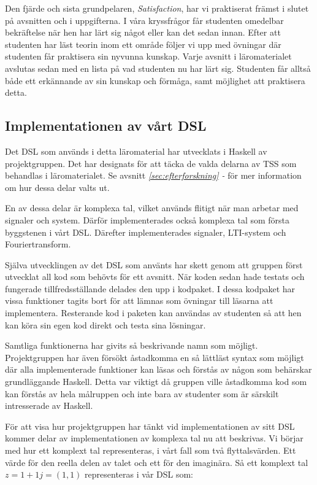 \documentclass[12pt,a4paper,twoside,openright]{article}
\begin{document}
Den fjärde och sista grundpelaren, \textit{Satisfaction}, har vi
praktiserat främst i slutet på avsnitten och i uppgifterna. I våra
kryssfrågor får studenten omedelbar bekräftelse när hen har lärt sig
något eller kan det sedan innan. Efter att studenten har läst teorin
inom ett område följer vi upp med övningar där studenten får
praktisera sin nyvunna kunskap. Varje avsnitt i läromaterialet
avslutas sedan med en lista på vad studenten nu har lärt
sig. Studenten får alltså både ett erkännande av sin kunskap och
förmåga, samt möjlighet att praktisera detta.

\subsection{Implementationen av vårt DSL}
\label{sec:implDSL}
Det DSL som används i detta läromaterial har utvecklats i Haskell av
projektgruppen. Det har designats för att täcka de valda delarna av
TSS som behandlas i läromaterialet. Se avsnitt
\textit{\ref{sec:efterforskning} - } för mer
information om hur dessa delar valts ut.

En av dessa delar är komplexa tal, vilket används flitigt när man
arbetar med signaler och system. Därför implementerades också komplexa
tal som första byggstenen i vårt DSL. Därefter implementerades
signaler, LTI-system och Fouriertransform.

Själva utvecklingen av det DSL som använts har skett genom att gruppen
först utvecklat all kod som behövts för ett avsnitt. När koden sedan
hade testats och fungerade tillfredsställande delades den upp i
kodpaket. I dessa kodpaket har vissa funktioner tagits bort för att
lämnas som övningar till läsarna att implementera. Resterande kod i
paketen kan användas av studenten så att hen kan köra sin egen kod
direkt och testa sina lösningar.

Samtliga funktionerna har givits så beskrivande namn som
möjligt. Projektgruppen har även försökt åstadkomma en så lättläst
syntax som möjligt där alla implementerade funktioner kan läsas och
förstås av någon som behärskar grundläggande Haskell. Detta var
viktigt då gruppen ville åstadkomma kod som kan förstås av hela
målruppen och inte bara av studenter som är särskilt intresserade av
Haskell.


För att visa hur projektgruppen har tänkt vid implementationen av sitt
DSL kommer delar av implementationen av komplexa tal nu att
beskrivas. Vi börjar med hur ett komplext tal representeras, i vårt
fall som två flyttalsvärden. Ett värde för den reella delen av talet
och ett för den imaginära. Så ett komplext tal
\(z = 1 + 1j = (1,1) \) representeras i vår DSL som:
\end{document}
